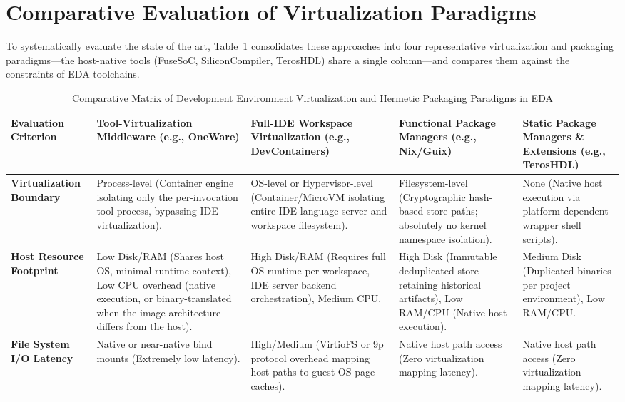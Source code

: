 \section{Comparative Evaluation of Virtualization Paradigms}
To systematically evaluate the state of the art, Table~\ref{tab:virtualization_matrix} consolidates these approaches into four representative virtualization and packaging paradigms---the host-native tools (FuseSoC, SiliconCompiler, TerosHDL) share a single column---and compares them against the constraints of EDA toolchains.

\begin{table}[htbp]
\centering
\caption{Comparative Matrix of Development Environment Virtualization and Hermetic Packaging Paradigms in EDA}
\label{tab:virtualization_matrix}
\footnotesize
\setlength{\tabcolsep}{3pt}
\begin{tabularx}{\textwidth}{@{} >{\hsize=1.2\hsize\raggedright\arraybackslash}X >{\hsize=0.95\hsize\raggedright\arraybackslash}X >{\hsize=0.95\hsize\raggedright\arraybackslash}X >{\hsize=0.95\hsize\raggedright\arraybackslash}X >{\hsize=0.95\hsize\raggedright\arraybackslash}X @{}}
\textbf{Evaluation Criterion} & 
\textbf{Tool-Virtualization Middleware (e.g., OneWare)} & 
\textbf{Full-IDE Workspace Virtualization (e.g., DevContainers)} & 
\textbf{Functional Package Managers (e.g., Nix/Guix)} & 
\textbf{Static Package Managers \& Extensions (e.g., TerosHDL)} \\
\midrule
\textbf{Virtualization Boundary} & Process-level (Container engine isolating only the per-invocation tool process, bypassing IDE virtualization). & OS-level or Hypervisor-level (Container/MicroVM isolating entire IDE language server and workspace filesystem). & Filesystem-level (Cryptographic hash-based store paths; absolutely no kernel namespace isolation). & None (Native host execution via platform-dependent wrapper shell scripts). \\
\addlinespace
\textbf{Host Resource Footprint} & Low Disk/RAM (Shares host OS, minimal runtime context), Low CPU overhead (native execution, or binary-translated when the image architecture differs from the host). & High Disk/RAM (Requires full OS runtime per workspace, IDE server backend orchestration), Medium CPU. & High Disk (Immutable deduplicated store retaining historical artifacts), Low RAM/CPU (Native host execution). & Medium Disk (Duplicated binaries per project environment), Low RAM/CPU. \\
\addlinespace
\textbf{File System I/O Latency} & Native or near-native bind mounts (Extremely low latency). & High/Medium (VirtioFS or 9p protocol overhead mapping host paths to guest OS page caches). & Native host path access (Zero virtualization mapping latency). & Native host path access (Zero virtualization mapping latency). \\

\end{tabularx}
\end{table}
